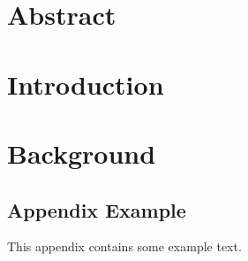\documentclass[12pt, a4paper, doc, biblatex, english]{apa7}
\begin{document}


\frontmatter
\setlength{\parindent}{0pt}

\newpage
\section*{Abstract}
\label{kap:Abstract}

%

\newpage
\renewcommand{\contentsname}{Table of Contents}
\renewcommand{\listfigurename}{Table of Figures}
\renewcommand{\listtablename}{Table of Tables}
\tableofcontents
\listoffigures
\listoftables

\newpage
\mainmatter

\section{Introduction}
\label{kap:Introduction}


\newpage
\section{Background}
\label{kap:Background}



\newpage
\renewcommand\refname{References}
\printbibliography


\newpage


\begin{appendices}

\newpage
\section{Appendix Example}
\label{Appendix:Example}
\vfill
\begin{adjustwidth}{3cm}{3cm}
This appendix contains some example text.
\end{adjustwidth}
\vfill
\setcounter{figure}{0}
\newpage


\end{appendices}
\end{document}
